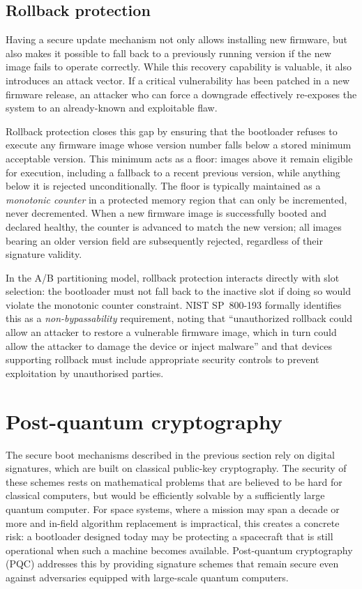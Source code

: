 \subsection{Rollback protection}
\label{subsection:bg-secureboot-rollback}

Having a secure update mechanism not only allows installing new firmware, but also makes it possible to fall back to a previously running version if the new image fails to operate correctly. While this recovery capability is valuable, it also introduces an attack vector. If a critical vulnerability has been patched in a new firmware release, an attacker who can force a downgrade effectively re-exposes the system to an already-known and exploitable flaw.

Rollback protection closes this gap by ensuring that the bootloader refuses to execute any firmware image whose version number falls below a stored minimum acceptable version. This minimum acts as a floor: images above it remain eligible for execution, including a fallback to a recent previous version, while anything below it is rejected unconditionally. The floor is typically maintained as a \emph{monotonic counter} in a protected memory region that can only be incremented, never decremented. When a new firmware image is successfully booted and declared healthy, the counter is advanced to match the new version; all images bearing an older version field are subsequently rejected, regardless of their signature validity.

In the A/B partitioning model, rollback protection interacts directly with slot selection: the bootloader must not fall back to the inactive slot if doing so would violate the monotonic counter constraint. NIST SP~800-193 \cite{NIST-sp-800-193} formally identifies this as a \emph{non-bypassability} requirement, noting that ``unauthorized rollback could allow an attacker to restore a vulnerable firmware image, which in turn could allow the attacker to damage the device or inject malware'' and that devices supporting rollback must include appropriate security controls to prevent exploitation by unauthorised parties.

\section{Post-quantum cryptography}
\label{section:bg-pq}

The secure boot mechanisms described in the previous section rely on digital signatures, which are built on classical public-key cryptography. The security of these schemes rests on mathematical problems that are believed to be hard for classical computers, but would be efficiently solvable by a sufficiently large quantum computer. For space systems, where a mission may span a decade or more and in-field algorithm replacement is impractical, this creates a concrete risk: a bootloader designed today may be protecting a spacecraft that is still operational when such a machine becomes available. Post-quantum cryptography (PQC) addresses this by providing signature schemes that remain secure even against adversaries equipped with large-scale quantum computers.

